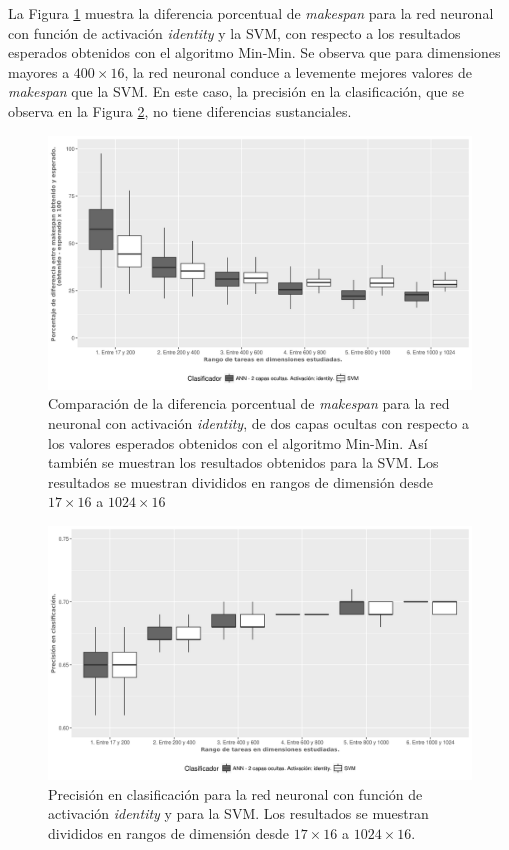 La Figura \ref{fig:identity_makespan} muestra la diferencia porcentual de \textit{makespan} para la red neuronal con función de activación \textit{identity} y la SVM, con respecto a los resultados esperados obtenidos con el algoritmo Min-Min. Se observa que para dimensiones mayores a $ 400 \times 16$, la red neuronal conduce a levemente mejores valores de \textit{makespan} que la SVM. En este caso, la precisión en la clasificación, que se observa en la Figura \ref{fig:identity_accuracy}, no tiene diferencias sustanciales. 

\begin{figure}[H]
  \centering
  \includegraphics[width=\columnwidth]{imagenes/identity/2_medianas_diferenciasann_2_capas_ocultas_identity.png}
  \caption{Comparación de la diferencia porcentual de \textit{makespan} para la red neuronal con activación \textit{identity}, de dos capas ocultas con respecto a los valores esperados obtenidos con el algoritmo Min-Min. Así también se muestran los resultados obtenidos para la SVM. Los resultados se muestran divididos en rangos de dimensión desde $ 17 \times 16$ a $ 1024 \times 16$}
  \label{fig:identity_makespan}
\end{figure}

\begin{figure}[H]
  \centering
  \includegraphics[width=\columnwidth]{imagenes/identity/3_accuracy_ann_2_capas_ocultas_identity.png}
  \caption{Precisión en clasificación para la red neuronal con función de activación \textit{identity} y para la SVM. Los resultados se muestran divididos en rangos de dimensión desde $ 17 \times 16$ a $ 1024 \times 16$.}
  \label{fig:identity_accuracy}
\end{figure}

